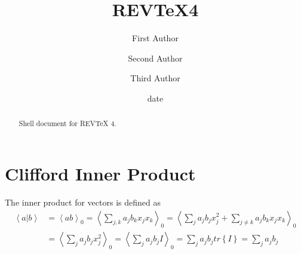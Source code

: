 \documentclass[aps,preprint]{revtex4}%
\begin{document}
\title[Short title for running header]{REV\TeX4}
\author{First Author}
\author{Second Author}
\author{Third Author}

\begin{abstract}
Shell document for REV\TeX{} 4.

\end{abstract}
\date[Date text]{date}




\maketitle
\tableofcontents


\section{Clifford Inner Product}

The inner product for vectors is defined as
\begin{align}
\left\langle a\left\vert b\right.  \right\rangle  & =\left\langle
ab\right\rangle _{0}=\left\langle \sum_{j,k}a_{j}b_{k}x_{j}x_{k}\right\rangle
_{0}=\left\langle \sum_{j}a_{j}b_{j}x_{j}^{2}+\sum_{j\neq k}a_{j}b_{k}%
x_{j}x_{k}\right\rangle _{0}\\
& =\left\langle \sum_{j}a_{j}b_{j}x_{j}^{2}\right\rangle _{0}=\left\langle
\sum_{j}a_{j}b_{j}I\right\rangle _{0}=\sum_{j}a_{j}b_{j}tr\left\{  I\right\}
=\sum_{j}a_{j}b_{j}%
\end{align}
\end{document}
